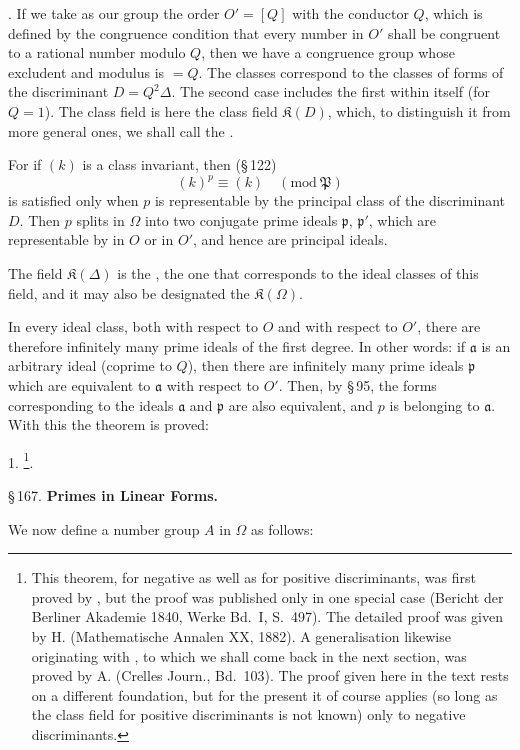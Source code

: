 . If we take as our group the order $O' = [Q]$ with the conductor $Q$, which is defined by the congruence condition that every number in $O'$ shall be congruent to a rational number modulo $Q$, then we have a congruence group whose excludent and modulus is $= Q$. The classes correspond to the classes of forms of the discriminant $D = Q^2\Delta$. The second case includes the first within itself (for $Q = 1$). The class field is here the class field $\mathfrak{K}(D)$, which, to distinguish it from more general ones, we shall call the .

For if $(k)$ is a class invariant, then (\S\,122)
\[
(k)^p \equiv (k) \quad (\mathrm{mod}\ \mathfrak{P})
\]
is satisfied only when $p$ is representable by the principal class of the discriminant $D$. Then $p$ splits in $\Omega$ into two conjugate prime ideals $\mathfrak{p}$, $\mathfrak{p}'$, which are representable by  in $O$ or in $O'$, and hence are principal ideals.

The field $\mathfrak{K}(\Delta)$ is the , the one that corresponds to the ideal classes of this field, and it may also be designated the  $\mathfrak{K}(\Omega)$.

In every ideal class, both with respect to $O$ and with respect to $O'$, there are therefore infinitely many prime ideals of the first degree. In other words: if $\mathfrak{a}$ is an arbitrary ideal (coprime to $Q$), then there are infinitely many prime ideals $\mathfrak{p}$ which are equivalent to $\mathfrak{a}$ with respect to $O'$. Then, by \S\,95, the forms corresponding to the ideals $\mathfrak{a}$ and $\mathfrak{p}$ are also equivalent, and $p$ is  belonging to $\mathfrak{a}$. With this the theorem is proved:

1. \footnote{This theorem, for negative as well as for positive discriminants, was first proved by , but the proof was published only in one special case (Bericht der Berliner Akademie 1840, Werke Bd.\ I, S.\ 497). The detailed proof was given by H.  (Mathematische Annalen XX, 1882). A generalisation likewise originating with , to which we shall come back in the next section, was proved by A.  (Crelles Journ., Bd.\ 103). The proof given here in the text rests on a different foundation, but for the present it of course applies (so long as the class field for positive discriminants is not known) only to negative discriminants.}.

\begin{center}
\S\,167. \textbf{Primes in Linear Forms.}
\end{center}

We now define a number group $A$ in $\Omega$ as follows:
